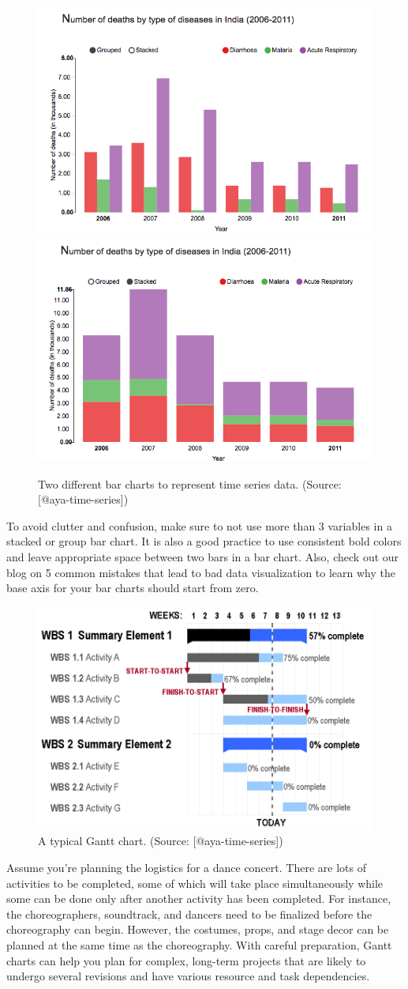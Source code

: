 \documentclass[]{book}
\theoremstyle{definition}
\theoremstyle{definition}
\theoremstyle{definition}
\theoremstyle{remark}
\begin{document}
\begin{figure}

{\centering \includegraphics[width=0.4\linewidth]{images/aya-bar1} \includegraphics[width=0.4\linewidth]{images/aya-bar2} 

}

\caption{Two different bar charts to represent time series data. (Source: [@aya-time-series])}\label{fig:aya-bar}
\end{figure}

To avoid clutter and confusion, make sure to not use more than 3
variables in a stacked or group bar chart. It is also a good practice to
use consistent bold colors and leave appropriate space between two bars
in a bar chart. Also, check out our blog on 5 common mistakes that lead
to bad data visualization to learn why the base axis for your bar charts
should start from zero.

\begin{figure}

{\centering \includegraphics[width=0.5\linewidth]{images/aya-gantt} 

}

\caption{A typical Gantt chart. (Source: [@aya-time-series])}\label{fig:aya-gantt}
\end{figure}

Assume you're planning the logistics for a dance concert. There are lots
of activities to be completed, some of which will take place
simultaneously while some can be done only after another activity has
been completed. For instance, the choreographers, soundtrack, and
dancers need to be finalized before the choreography can begin. However,
the costumes, props, and stage decor can be planned at the same time as
the choreography. With careful preparation, Gantt charts can help you
plan for complex, long-term projects that are likely to undergo several
revisions and have various resource and task dependencies.
\end{document}
